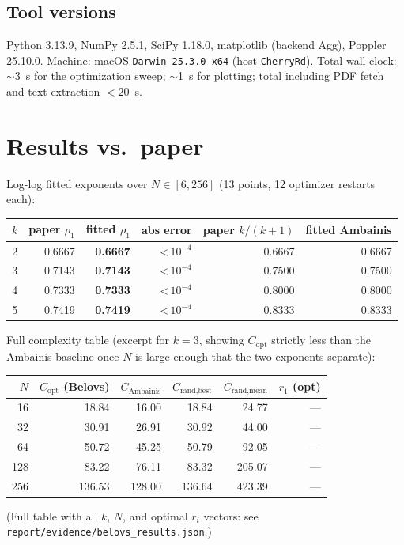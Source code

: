 \documentclass[11pt]{article}
\begin{document}
\subsection*{Tool versions}
Python 3.13.9, NumPy 2.5.1, SciPy 1.18.0, matplotlib (backend Agg),
Poppler 25.10.0. Machine: macOS \verb|Darwin 25.3.0 x64| (host
\texttt{CherryRd}).  Total wall-clock: $\sim$3~s for the optimization
sweep; $\sim$1~s for plotting; total including PDF fetch and text
extraction $<20$~s.

\section{Results vs.\ paper}
Log-log fitted exponents over $N \in [6, 256]$ (13 points, 12 optimizer
restarts each):
\begin{center}
\begin{tabular}{crrrrr}
\toprule
$k$ & paper $\rho_1$ & \textbf{fitted $\rho_1$} & abs error &
      paper $k/(k+1)$ & fitted Ambainis \\
\midrule
2 & 0.6667 & \textbf{0.6667} & \textless\,$10^{-4}$ & 0.6667 & 0.6667 \\
3 & 0.7143 & \textbf{0.7143} & \textless\,$10^{-4}$ & 0.7500 & 0.7500 \\
4 & 0.7333 & \textbf{0.7333} & \textless\,$10^{-4}$ & 0.8000 & 0.8000 \\
5 & 0.7419 & \textbf{0.7419} & \textless\,$10^{-4}$ & 0.8333 & 0.8333 \\
\bottomrule
\end{tabular}
\end{center}

\noindent
Full complexity table (excerpt for $k=3$, showing $C_{\text{opt}}$
strictly less than the Ambainis baseline once $N$ is large enough that
the two exponents separate):
\begin{center}
\small
\begin{tabular}{rrrrrr}
\toprule
$N$ & $C_{\text{opt}}$ (Belovs) & $C_{\text{Ambainis}}$ & $C_{\text{rand,best}}$ & $C_{\text{rand,mean}}$ & $r_1$ (opt) \\
\midrule
16   & 18.84  & 16.00  & 18.84  & 24.77  & --- \\
32   & 30.91  & 26.91  & 30.92  & 44.00  & --- \\
64   & 50.72  & 45.25  & 50.79  & 92.05  & --- \\
128  & 83.22  & 76.11  & 83.32  & 205.07 & --- \\
256  & 136.53 & 128.00 & 136.64 & 423.39 & --- \\
\bottomrule
\end{tabular}
\end{center}
\noindent
(Full table with all $k$, $N$, and optimal $r_i$ vectors: see
\verb|report/evidence/belovs_results.json|.)
\end{document}
